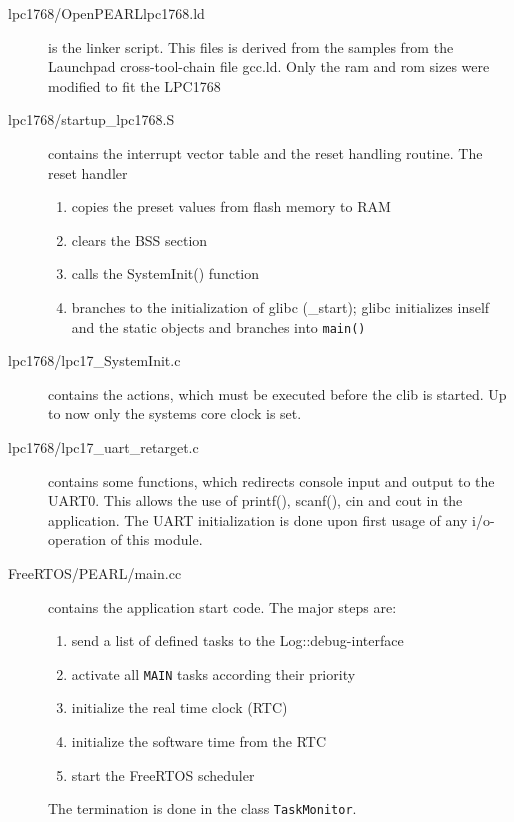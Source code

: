 \begin{description}
\item[lpc1768/OpenPEARLlpc1768.ld] is the linker script. This files is derived from
   the samples from the Launchpad cross-tool-chain file gcc.ld. 
   Only the ram and rom sizes were modified to fit the LPC1768 
\item[lpc1768/startup\_lpc1768.S] contains the interrupt vector table and the 
   reset handling routine. The reset handler 
   \begin{enumerate}
   \item copies the preset values from flash memory to RAM
   \item clears the BSS section 
   \item  calls the SystemInit() function
   \item  branches to the initialization of glibc (\_start); glibc
      initializes inself and the static objects and branches into \verb|main()|
   \end{enumerate}
\item[lpc1768/lpc17\_SystemInit.c] contains the actions, which must be executed
   before the clib is started. Up to now only the systems core clock is 
   set.
\item [lpc1768/lpc17\_uart\_retarget.c] contains some functions, which redirects console 
   input and output to the UART0.  This allows the use of printf(), 
   scanf(), cin and cout in the application. The UART initialization is done 
   upon first usage of any i/o-operation of this module.
\item[FreeRTOS/PEARL/main.cc] contains the application start code.
 The major steps are:
  \begin{enumerate}
  \item send a list of defined tasks to the Log::debug-interface
  \item activate all \verb|MAIN| tasks according their priority
  \item initialize the real time clock (RTC)
  \item initialize the software time from the RTC
  \item start the FreeRTOS scheduler 
  \end{enumerate}
  The termination is done in the class \verb|TaskMonitor|. 
\end{description}

